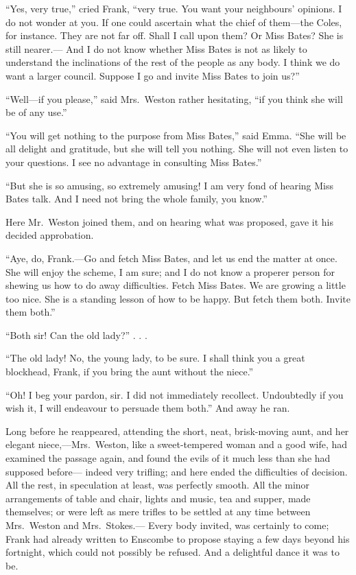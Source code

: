 ``Yes, very true,'' cried Frank, ``very true.  You want your neighbours'
opinions.  I do not wonder at you.  If one could ascertain what the
chief of them---the Coles, for instance.  They are not far off.
Shall I call upon them?  Or Miss Bates?  She is still nearer.---%
And I do not know whether Miss Bates is not as likely to understand
the inclinations of the rest of the people as any body.  I think
we do want a larger council.  Suppose I go and invite Miss Bates
to join us?''

``Well---if you please,'' said Mrs.\ Weston rather hesitating, ``if you
think she will be of any use.''

``You will get nothing to the purpose from Miss Bates,'' said Emma.
``She will be all delight and gratitude, but she will tell you nothing.
She will not even listen to your questions.  I see no advantage in
consulting Miss Bates.''

``But she is so amusing, so extremely amusing!  I am very fond
of hearing Miss Bates talk.  And I need not bring the whole family,
you know.''

Here Mr.\ Weston joined them, and on hearing what was proposed,
gave it his decided approbation.

``Aye, do, Frank.---Go and fetch Miss Bates, and let us end the matter
at once.  She will enjoy the scheme, I am sure; and I do not know
a properer person for shewing us how to do away difficulties.
Fetch Miss Bates.  We are growing a little too nice.  She is
a standing lesson of how to be happy.  But fetch them both.
Invite them both.''

``Both sir!  Can the old lady?'' . . .

``The old lady!  No, the young lady, to be sure.  I shall think you
a great blockhead, Frank, if you bring the aunt without the niece.''

``Oh!  I beg your pardon, sir.  I did not immediately recollect.
Undoubtedly if you wish it, I will endeavour to persuade them both.''
And away he ran.

Long before he reappeared, attending the short, neat, brisk-moving aunt,
and her elegant niece,---Mrs.\ Weston, like a sweet-tempered
woman and a good wife, had examined the passage again,
and found the evils of it much less than she had supposed before---%
indeed very trifling; and here ended the difficulties of decision.
All the rest, in speculation at least, was perfectly smooth.
All the minor arrangements of table and chair, lights and music,
tea and supper, made themselves; or were left as mere trifles
to be settled at any time between Mrs.\ Weston and Mrs.\ Stokes.---%
Every body invited, was certainly to come; Frank had already written
to Enscombe to propose staying a few days beyond his fortnight,
which could not possibly be refused.  And a delightful dance it was
to be.


